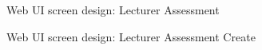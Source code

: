 \begin{figure}[H]
\centering	
{}
\caption{Web UI screen design: Lecturer Assessment}
\end{figure}

\begin{figure}[H]
\centering	
{}
\caption{Web UI screen design: Lecturer Assessment Create}
\end{figure}

